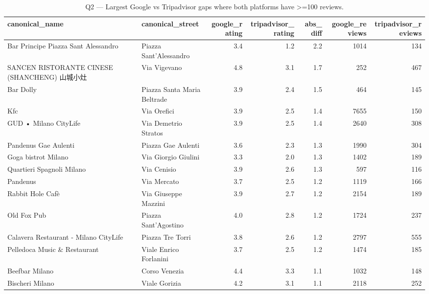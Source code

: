 \begin{table}[ht]
\centering
\caption{Q2 — Largest Google vs Tripadvisor gaps where both platforms have >=100 reviews.}
\label{tab:q2_robust_google_vs_tripadvisor}
{\tiny
\begin{tabular}{llrrrrr}
\toprule
canonical\_name & canonical\_street & google\_rating & tripadvisor\_rating & abs\_diff & google\_reviews & tripadvisor\_reviews \\
\midrule
Bar Principe Piazza Sant Alessandro & Piazza Sant'Alessandro & 3.4 & 1.2 & 2.2 & 1014 & 134 \\
SANCEN RISTORANTE CINESE (SHANCHENG) 山城小灶 & Via Vigevano & 4.8 & 3.1 & 1.7 & 252 & 467 \\
Bar Dolly & Piazza Santa Maria Beltrade & 3.9 & 2.4 & 1.5 & 464 & 145 \\
Kfc & Via Orefici & 3.9 & 2.5 & 1.4 & 7655 & 150 \\
GUD • Milano CityLife & Via Demetrio Stratos & 3.9 & 2.5 & 1.4 & 2640 & 308 \\
Pandenus Gae Aulenti & Piazza Gae Aulenti & 3.6 & 2.3 & 1.3 & 1990 & 304 \\
Goga bistrot Milano & Via Giorgio Giulini & 3.3 & 2.0 & 1.3 & 1402 & 189 \\
Quartieri Spagnoli Milano & Via Cenisio & 3.9 & 2.6 & 1.3 & 597 & 116 \\
Pandenus & Via Mercato & 3.7 & 2.5 & 1.2 & 1119 & 166 \\
Rabbit Hole Cafè & Via Giuseppe Mazzini & 3.9 & 2.7 & 1.2 & 2154 & 189 \\
Old Fox Pub & Piazza Sant'Agostino & 4.0 & 2.8 & 1.2 & 1724 & 237 \\
Calavera Restaurant - Milano CityLife & Piazza Tre Torri & 3.8 & 2.6 & 1.2 & 2797 & 555 \\
Pelledoca Music \& Restaurant & Viale Enrico Forlanini & 3.7 & 2.5 & 1.2 & 1474 & 185 \\
Beefbar Milano & Corso Venezia & 4.4 & 3.3 & 1.1 & 1032 & 148 \\
Bischeri Milano & Viale Gorizia & 4.2 & 3.1 & 1.1 & 2118 & 252 \\
\bottomrule
\end{tabular}
}
\end{table}
